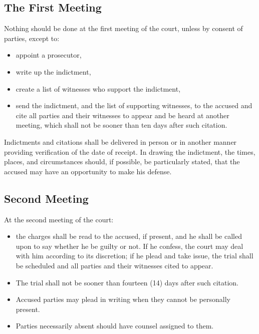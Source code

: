 \documentclass[
]{book}
\providecommand{\tightlist}{%
  \setlength{\itemsep}{0pt}\setlength{\parskip}{0pt}}
\begin{document}
\hypertarget{the-first-meeting}{%
\subsection{The First Meeting}\label{the-first-meeting}}

Nothing should be done at the first meeting of the court, unless by consent of parties, except to:

\begin{itemize}
\tightlist
\item
  appoint a prosecutor,
\item
  write up the indictment,
\item
  create a list of witnesses who support the indictment,
\item
  send the indictment, and the list of supporting witnesses, to the accused and cite all parties and their witnesses to appear and be heard at another meeting, which shall not be sooner than ten days after such citation.
\end{itemize}

Indictments and citations shall be delivered in person or in another manner providing verification of the date of receipt. In drawing the indictment, the times, places, and circumstances should, if possible, be particularly stated, that the accused may have an opportunity to make his defense.

\hypertarget{second-meeting}{%
\subsection{Second Meeting}\label{second-meeting}}

At the second meeting of the court:

\begin{itemize}
\tightlist
\item
  the charges shall be read to the accused, if present, and he shall be called upon to say whether he be guilty or not. If he confess, the court may deal with him according to its discretion; if he plead and take issue, the trial shall be scheduled and all parties and their witnesses cited to appear.
\item
  The trial shall not be sooner than fourteen (14) days after such citation.
\item
  Accused parties may plead in writing when they cannot be personally present.
\item
  Parties necessarily absent should have counsel assigned to them.
\end{itemize}
\end{document}
